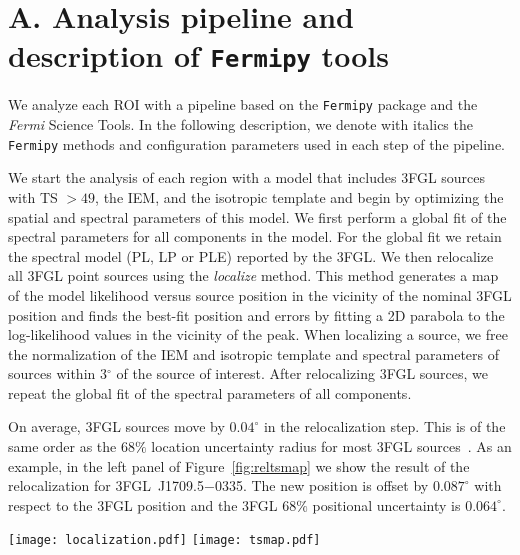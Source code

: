 \documentclass[iop]{emulateapj}
\newcommand{\fermipy}{\texttt{Fermipy}\xspace}
\begin{document}


\appendix

\section{A. Analysis pipeline and description of \fermipy tools}
\label{sec:fermipy}

We analyze each ROI with a pipeline based on the \fermipy
package and the {\it Fermi} Science Tools.  In the following description, we
denote with italics the \fermipy methods and configuration parameters
used in each step of the pipeline.

We start the analysis of each region with a model that includes 3FGL
sources with TS $> 49$, the IEM, and the isotropic template and begin
by optimizing the spatial and spectral parameters of this model.  We
first perform a global fit of the spectral parameters for all
components in the model.  For the global fit we retain the spectral
model (PL, LP or PLE) reported by the 3FGL.  We then relocalize all 3FGL
point sources using the {\it localize} method.  This method generates
a map of the model likelihood versus source position in the vicinity
of the nominal 3FGL position and finds the best-fit position and
errors by fitting a 2D parabola to the log-likelihood values in the
vicinity of the peak.  When localizing a source, we free the
normalization of the IEM and isotropic template and spectral
parameters of sources within 3$^\circ$ of the source of interest.
After relocalizing 3FGL sources, we repeat the global fit of the
spectral parameters of all components.

On average, 3FGL sources move by $0.04^{\circ}$ in the relocalization
step. This is of the same order as the $68\%$ location uncertainty
radius for most 3FGL sources~\citep{2015ApJS..218...23A}. As an example, in
the left panel of Figure~\ref{fig:reltsmap} we show the result of the
relocalization for 3FGL~J1709.5$-$0335. The new position is offset by
$0.087^{\circ}$ with respect to the 3FGL position and the 3FGL $68\%$
positional uncertainty is $0.064^{\circ}$.

\begin{figure*}
	\centering
\texttt{[image: localization.pdf]}
\texttt{[image: tsmap.pdf]}
\caption{Left panel: Positional uncertainty contours and best-fit
  position (solid black lines and x marker) from the localization of
  3FGL J1709.5$-$0335.  The color scale shows the difference in TS
  with respect to the best-fit position of the source.  The cross is
  the position of this source in 3FGL. Right panel: TS map of the
  ROI evaluated with a test source with a point-source morphology and
  a PL spectrum with photon index of 2.  The background model
  includes the IEM, isotropic template, and 3FGL sources with
  $TS>49$.}
\label{fig:reltsmap} 
\end{figure*}
\end{document}
